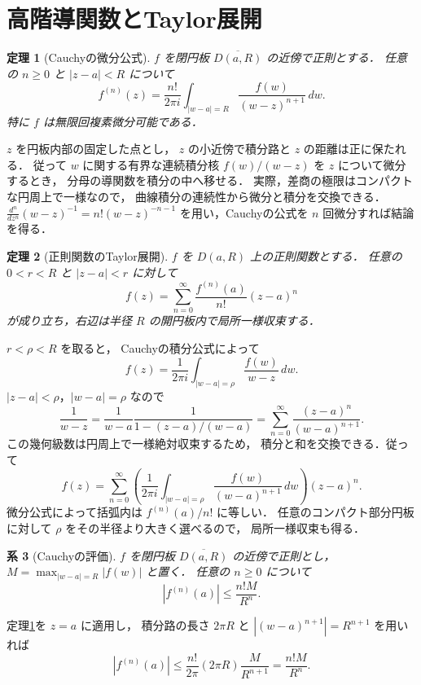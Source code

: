 \documentclass[a5paper,10pt,onecolumn]{jsarticle}
\makeatletter
\theoremstyle{mathnotetheorem}
\newtheorem{theorem}{定理}[section]
\newtheorem{corollary}[theorem]{系}
\renewcommand{\proofname}{証明}
\renewenvironment{proof}[1][\proofname]{%
  \par\pushQED{\qed}\normalfont\topsep4\p@\@plus2\p@\relax
  \trivlist\item[\hskip\labelsep\bfseries #1]\ignorespaces
}{\popQED\endtrivlist\@endpefalse}
\makeatother
\begin{document}
\section{高階導関数とTaylor展開}

\begin{theorem}[Cauchyの微分公式]\label{thm:derivative}
$f$ を閉円板 $\overline{D(a,R)}$ の近傍で正則とする．
任意の $n\ge0$ と $|z-a|<R$ について
\[
 f^{(n)}(z)=\frac{n!}{2\pi i}
 \int_{|w-a|=R}\frac{f(w)}{(w-z)^{n+1}}\,dw.
\]
特に $f$ は無限回複素微分可能である．
\end{theorem}
\begin{proof}
$z$ を円板内部の固定した点とし，
$z$ の小近傍で積分路と $z$ の距離は正に保たれる．
従って $w$ に関する有界な連続積分核
$f(w)/(w-z)$ を $z$ について微分するとき，
分母の導関数を積分の中へ移せる．
実際，差商の極限はコンパクトな円周上で一様なので，
曲線積分の連続性から微分と積分を交換できる．
$\frac{d^n}{dz^n}(w-z)^{-1}
 =n!(w-z)^{-n-1}$
を用い，Cauchyの公式を $n$ 回微分すれば結論を得る．
\end{proof}

\begin{theorem}[正則関数のTaylor展開]\label{thm:taylor}
$f$ を $D(a,R)$ 上の正則関数とする．
任意の $0<r<R$ と $|z-a|<r$ に対して
\[
 f(z)=\sum_{n=0}^\infty\frac{f^{(n)}(a)}{n!}(z-a)^n
\]
が成り立ち，右辺は半径 $R$ の開円板内で局所一様収束する．
\end{theorem}
\begin{proof}
$r<\rho<R$ を取ると，
Cauchyの積分公式によって
\[
 f(z)=\frac1{2\pi i}\int_{|w-a|=\rho}
   \frac{f(w)}{w-z}\,dw.
\]
$|z-a|<\rho$，$|w-a|=\rho$ なので
\[
 \frac1{w-z}
 =\frac1{w-a}\frac1{1-(z-a)/(w-a)}
 =\sum_{n=0}^\infty\frac{(z-a)^n}{(w-a)^{n+1}}.
\]
この幾何級数は円周上で一様絶対収束するため，
積分と和を交換できる．従って
\[
 f(z)=\sum_{n=0}^\infty
 \left(\frac1{2\pi i}\int_{|w-a|=\rho}
       \frac{f(w)}{(w-a)^{n+1}}\,dw\right)(z-a)^n.
\]
微分公式によって括弧内は $f^{(n)}(a)/n!$ に等しい．
任意のコンパクト部分円板に対して
$\rho$ をその半径より大きく選べるので，
局所一様収束も得る．
\end{proof}

\begin{corollary}[Cauchyの評価]\label{cor:estimate}
$f$ を閉円板 $\overline{D(a,R)}$ の近傍で正則とし，
$M=\max_{|w-a|=R}|f(w)|$ と置く．
任意の $n\ge0$ について
\[
 |f^{(n)}(a)|\le\frac{n!M}{R^n}.
\]
\end{corollary}
\begin{proof}
定理\ref{thm:derivative}を $z=a$ に適用し，
積分路の長さ $2\pi R$ と
$|(w-a)^{n+1}|=R^{n+1}$ を用いれば
\[
 |f^{(n)}(a)|
 \le\frac{n!}{2\pi}(2\pi R)\frac M{R^{n+1}}
 =\frac{n!M}{R^n}.
\]
\end{proof}
\end{document}
